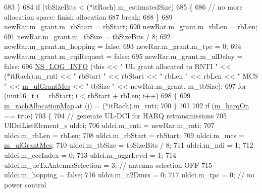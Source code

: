 \begin{DoxyCode}
683         \}
684       \textcolor{keywordflow}{if} (tbSizeBits < (*itRach).m\_estimatedSize)
685         \{
686           \textcolor{comment}{// no more allocation space: finish allocation}
687           \textcolor{keywordflow}{break};
688         \}
689       newRar.m\_grant.m\_rbStart = rbStart;
690       newRar.m\_grant.m\_rbLen = rbLen;
691       newRar.m\_grant.m\_tbSize = tbSizeBits / 8;
692       newRar.m\_grant.m\_hopping = \textcolor{keyword}{false};
693       newRar.m\_grant.m\_tpc = 0;
694       newRar.m\_grant.m\_cqiRequest = \textcolor{keyword}{false};
695       newRar.m\_grant.m\_ulDelay = \textcolor{keyword}{false};
696       \hyperlink{group__logging_gafbd73ee2cf9f26b319f49086d8e860fb}{NS\_LOG\_INFO} (\textcolor{keyword}{this} << \textcolor{stringliteral}{" UL grant allocated to RNTI "} << (*itRach).m\_rnti << \textcolor{stringliteral}{" rbStart "} << 
      rbStart << \textcolor{stringliteral}{" rbLen "} << rbLen << \textcolor{stringliteral}{" MCS "} << \hyperlink{classns3_1_1FdMtFfMacScheduler_ab8c9552a2f6d8786259bfda40562f792}{m\_ulGrantMcs} << \textcolor{stringliteral}{" tbSize "} << newRar.m\_grant.
      m\_tbSize);
697       \textcolor{keywordflow}{for} (uint16\_t \hyperlink{bernuolliDistribution_8m_a6f6ccfcf58b31cb6412107d9d5281426}{i} = rbStart; \hyperlink{bernuolliDistribution_8m_a6f6ccfcf58b31cb6412107d9d5281426}{i} < rbStart + rbLen; \hyperlink{bernuolliDistribution_8m_a6f6ccfcf58b31cb6412107d9d5281426}{i}++)
698         \{
699           \hyperlink{classns3_1_1FdMtFfMacScheduler_aab050196c56e8564eb4d0c8aedd900d3}{m\_rachAllocationMap}.at (\hyperlink{bernuolliDistribution_8m_a6f6ccfcf58b31cb6412107d9d5281426}{i}) = (*itRach).m\_rnti;
700         \}
701 
702       \textcolor{keywordflow}{if} (\hyperlink{classns3_1_1FdMtFfMacScheduler_abc95b8f62ff797ff3fb9ed21322c5f35}{m\_harqOn} == \textcolor{keyword}{true})
703         \{
704           \textcolor{comment}{// generate UL-DCI for HARQ retransmissions}
705           UlDciListElement\_s uldci;
706           uldci.m\_rnti = newRar.m\_rnti;
707           uldci.m\_rbLen = rbLen;
708           uldci.m\_rbStart = rbStart;
709           uldci.m\_mcs = \hyperlink{classns3_1_1FdMtFfMacScheduler_ab8c9552a2f6d8786259bfda40562f792}{m\_ulGrantMcs};
710           uldci.m\_tbSize = tbSizeBits / 8;
711           uldci.m\_ndi = 1;
712           uldci.m\_cceIndex = 0;
713           uldci.m\_aggrLevel = 1;
714           uldci.m\_ueTxAntennaSelection = 3; \textcolor{comment}{// antenna selection OFF}
715           uldci.m\_hopping = \textcolor{keyword}{false};
716           uldci.m\_n2Dmrs = 0;
717           uldci.m\_tpc = 0; \textcolor{comment}{// no power control}

\end{DoxyCode}
